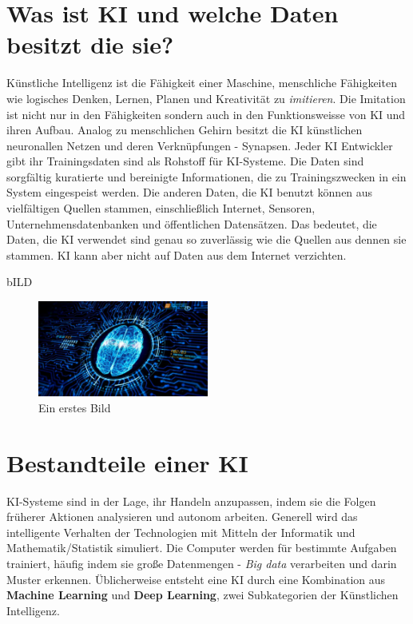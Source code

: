 \documentclass{report}
\begin{document}
\chapter{Was ist KI und welche Daten besitzt die sie?}

Künstliche Intelligenz ist die Fähigkeit einer Maschine, menschliche Fähigkeiten wie logisches Denken, 
Lernen, Planen und Kreativität zu \textit{imitieren}. Die Imitation ist nicht nur in den Fähigkeiten sondern auch in den 
Funktionsweisse von KI und ihren Aufbau. Analog zu menschlichen Gehirn besitzt die KI künstlichen neuronallen Netzen und 
deren Verknüpfungen - Synapsen. Jeder KI Entwickler gibt ihr Trainingsdaten sind als Rohstoff für KI-Systeme. Die Daten sind sorgfältig 
kuratierte und bereinigte Informationen, die zu Trainingszwecken in ein System eingespeist werden.
Die anderen Daten, die KI benutzt können aus vielfältigen Quellen stammen, einschließlich Internet, Sensoren,
  Unternehmensdatenbanken und öffentlichen Datensätzen. Das bedeutet, die Daten, die KI verwendet sind genau so zuverlässig wie die Quellen aus dennen sie stammen.
KI kann aber nicht auf Daten aus dem Internet verzichten.  


bILD\begin{figure}[h]
  \centering 
  \includegraphics[width=0.5\textwidth]{ki-im-sensor.jpg} 
  \caption{Ein erstes Bild}
  \label{fig:meme}
  \end{figure}

   \chapter{Bestandteile einer KI}
 
KI-Systeme sind in der Lage, ihr Handeln anzupassen, indem sie die Folgen früherer Aktionen analysieren und autonom arbeiten.
 Generell wird das intelligente Verhalten der 
Technologien mit Mitteln der Informatik und Mathematik/Statistik simuliert.
 Die Computer werden für bestimmte Aufgaben trainiert, häufig indem sie große Datenmengen - \textit{Big data}
 verarbeiten und darin Muster erkennen. Üblicherweise entsteht eine KI durch eine Kombination aus  \textbf{Machine
  Learning} und  \textbf{Deep Learning}, zwei Subkategorien der Künstlichen Intelligenz.
\end{document}
